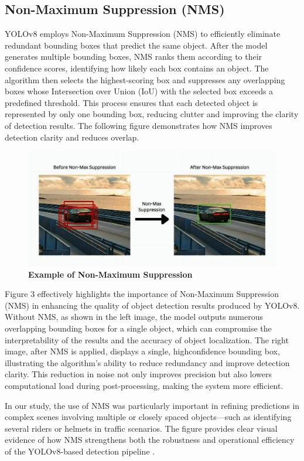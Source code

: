 \begin{refsection}
\subsection*{Non-Maximum Suppression (NMS)}


YOLOv8 employs Non-Maximum Suppression (NMS) to efficiently eliminate redundant bounding boxes that predict the same object. After the model generates multiple bounding boxes, NMS ranks them according to their confidence scores, identifying how likely each box contains an object. The algorithm then selects the highest-scoring box and suppresses any overlapping boxes whose Intersection over Union (IoU) with the selected box exceeds a predefined threshold. This process ensures that each detected object is represented by only one bounding box, reducing clutter and improving the clarity of detection results.
The following figure demonstrates how NMS improves detection clarity and reduces overlap.


\begin{figure}[H]
    \centering
    \includegraphics[width=1\textwidth]{figures/Fig 3.jpg}
    \caption{\textbf{Example of Non-Maximum Suppression }}
    \label{figures/Fig 3.jpg}
\end{figure}
Figure 3 effectively highlights the importance of Non-Maximum Suppression (NMS) in enhancing the quality of object detection results produced by YOLOv8. Without NMS, as shown in the left image, the model outputs numerous overlapping bounding boxes for a single object, which can compromise the interpretability of the results and the accuracy of object localization. The right image, after NMS is applied, displays a single, highconfidence bounding box, illustrating the algorithm’s ability to reduce redundancy and improve detection clarity. This reduction in noise not only improves precision but also lowers computational load during post-processing, making the system more efficient.


In our study, the use of NMS was particularly important in refining predictions in complex scenes involving multiple or closely spaced objects—such as identifying several riders or helmets in traffic scenarios. The figure provides clear visual evidence of how NMS strengthens both the robustness and operational efficiency of the YOLOv8-based detection pipeline \cite{ThePythonCode2021}.



\end{refsection}
